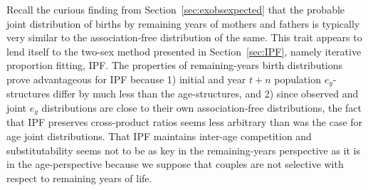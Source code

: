 \label{sec:ipfex}
Recall the curious finding from Section~\ref{sec:exobsexpected} that the
probable joint distribution of births by remaining years of mothers and fathers is typically
very similar to the association-free distribution of the same. This trait
appears to lend itself to the two-sex method presented in Section~\ref{sec:IPF},
namely iterative proportion fitting, IPF. The properties of remaining-years birth 
distributions prove advantageous for IPF because 1) initial and year
$t+n$ population $e_y$-structures differ by much less than the age-structures,
and 2) since observed and joint $e_y$ distributions are close to their own
association-free distributions, the fact that IPF preserves cross-product ratios
seems less arbitrary than was the case for age joint distributions. That IPF
maintains inter-age competition and substitutability seems not to be as key in
the remaining-years perspective as it is in the age-perspective because we suppose
that couples are not selective with respect to remaining years of life.









